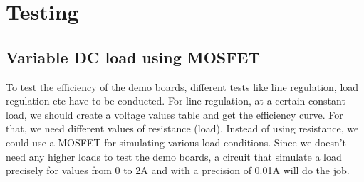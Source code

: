 

\chapter{Testing}

\section{Variable DC load using MOSFET}
To test the efficiency of the demo boards, different tests like line regulation, load regulation etc have to be conducted. For line regulation, at a certain constant load, we should create a voltage values table and get the efficiency curve. For that, we need different values of resistance (load). Instead of using resistance, we could use a MOSFET for simulating various load conditions. Since we doesn’t need any higher loads to test the demo boards, a circuit that simulate a load precisely for values from 0 to 2A and with a precision of 0.01A will do the job.
\\ \\

